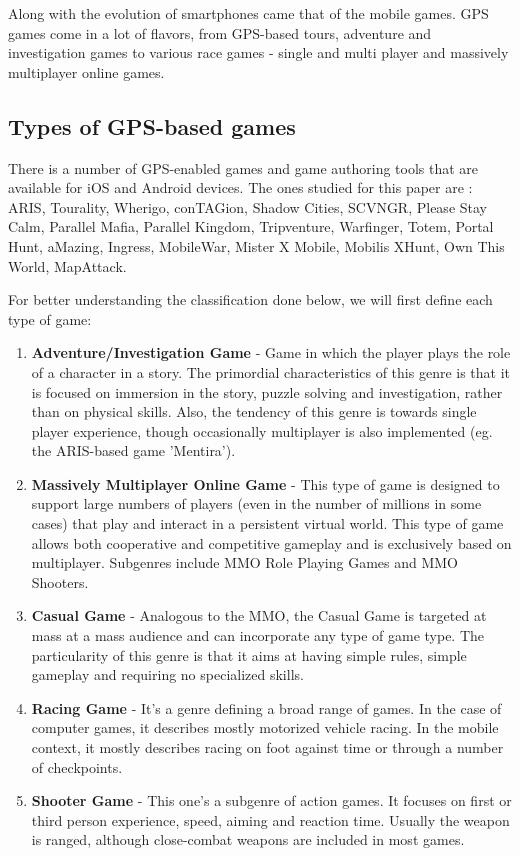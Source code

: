 \documentclass{article}
\begin{document}
Along with the evolution of smartphones came that of the mobile games. GPS games
come in a lot of flavors, from GPS-based tours, adventure and investigation
games to various race games - single and multi player and massively multiplayer
online games.


\subsection{Types of GPS-based games }

There is a number of GPS-enabled games and game authoring tools that are
available for iOS and Android devices. The ones studied for this paper are :
ARIS, Tourality, Wherigo, conTAGion, Shadow Cities, SCVNGR, Please Stay Calm,
Parallel Mafia, Parallel Kingdom, Tripventure, Warfinger, Totem, Portal Hunt,
aMazing, Ingress, MobileWar, Mister X Mobile, Mobilis XHunt, Own This World,
MapAttack.\newline

For better understanding the classification done below, we will first define
each type of game:

\begin{enumerate}
  \item \textbf{Adventure/Investigation Game} - Game in which the player plays
  the role of a character in a story. The primordial characteristics of this
  genre is that it is focused on immersion in the story, puzzle solving and
  investigation, rather than on physical skills. Also, the tendency of this
  genre is towards single player experience, though occasionally multiplayer is
  also implemented (eg. the ARIS-based game 'Mentira').
  
  \item \textbf{Massively Multiplayer Online Game} - This type of game is
  designed to support large numbers of players (even in the number of millions
  in some cases) that play and interact in a persistent virtual world. This type
  of game allows both cooperative and competitive gameplay and is exclusively
  based on multiplayer. Subgenres include MMO Role Playing Games and
  MMO Shooters.
  
  \item \textbf{Casual Game} - Analogous to the MMO, the Casual Game is targeted
  at mass at a mass audience and can incorporate any type of game type. The
  particularity of this genre is that it aims at having simple rules, simple
  gameplay and requiring no specialized skills. 
  
  \item \textbf{Racing Game} - It's a genre defining a broad range of games. In
  the case of computer games, it describes mostly motorized vehicle racing. In
  the mobile context, it mostly describes racing on foot against time or through
  a number of checkpoints.
  
  \item \textbf{Shooter Game} - This one's a subgenre of action games. It
  focuses on first or third person experience, speed, aiming and reaction time.
  Usually the weapon is ranged, although close-combat weapons are included in
  most games.
  
\end{enumerate}
\end{document}
